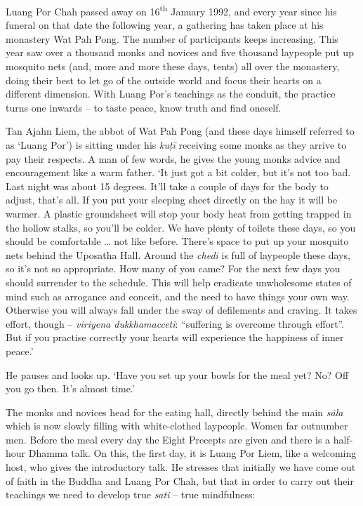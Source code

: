 Luang Por Chah passed away on 16\textsuperscript{th} January 1992, and every year since
his funeral on that date the following year, a gathering has taken place
at his monastery Wat Pah Pong. The number of participants keeps
increasing. This year saw over a thousand monks and novices and five
thousand laypeople put up mosquito nets (and, more and more these days, 
tents) all over the monastery, doing their best to let go of the outside
world and focus their hearts on a different dimension. With Luang Por's
teachings as the conduit, the practice turns one inwards -- to taste
peace, know truth and find oneself. 

Tan Ajahn Liem, the abbot of Wat Pah Pong (and these days himself
referred to as `Luang Por') is sitting under his \emph{kuṭī} receiving
some monks as they arrive to pay their respects. A man of few words, he
gives the young monks advice and encouragement like a warm father. `It
just got a bit colder, but it's not too bad. Last night was about 15
degrees. It'll take a couple of days for the body to adjust, that's all. 
If you put your sleeping sheet directly on the hay it will be warmer. A
plastic groundsheet will stop your body heat from getting trapped in the
hollow stalks, so you'll be colder. We have plenty of toilets these
days, so you should be comfortable \ldots{} not like before. There's
space to put up your mosquito nets behind the Uposatha Hall. Around the
\emph{chedi} is full of laypeople these days, so it's not so
appropriate. How many of you came? For the next few days you should
surrender to the schedule. This will help eradicate unwholesome states
of mind such as arrogance and conceit, and the need to have things your
own way. Otherwise you will always fall under the sway of defilements
and craving. It takes effort, though -- \emph{viriyena dukkhamacceti}: 
``suffering is overcome through effort''. But if you practise correctly
your hearts will experience the happiness of inner peace.'

He pauses and looks up. `Have you set up your bowls for the meal yet? 
No? Off you go then. It's almost time.'

The monks and novices head for the eating hall, directly behind the main
\emph{sāla} which is now slowly filling with white-clothed laypeople. 
Women far outnumber men. Before the meal every day the Eight Precepts
are given and there is a half-hour Dhamma talk. On this, the first day, 
it is Luang Por Liem, like a welcoming host, who gives the introductory
talk. He stresses that initially we have come out of faith in the Buddha
and Luang Por Chah, but that in order to carry out their teachings we
need to develop true \emph{sati} -- true mindfulness: 

